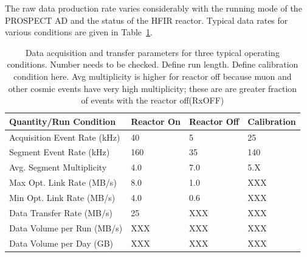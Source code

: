The raw data production rate varies considerably with the running mode of the PROSPECT AD and the status of the HFIR reactor.
Typical data rates for various conditions are given in Table~\ref{tab:dataRates}. 

\begin{table}[tbp]
  \begin{centering}
  \begin{tabular}{l|lll}
  Quantity/Run Condition& Reactor On & Reactor Off & Calibration \\ \hline
  Acquisition Event Rate (kHz) & 40 & 5 &  25 \\
  Segment Event Rate (kHz) & 160 & 35 &  140 \\
  Avg. Segment Multiplicity & 4.0 & 7.0 &  5.X \\
  Max Opt. Link Rate (MB/s) & 8.0 & 1.0 &  XXX \\
  Min Opt. Link Rate (MB/s) & 4.0 & 0.6 &  XXX \\
  Data Transfer Rate (MB/s) & 25 & XXX &  XXX \\
  Data Volume per Run (MB/s) & XXX & XXX &  XXX \\
  Data Volume per Day (GB) & XXX & XXX &  XXX \\
  \end{tabular}
  \caption[dataRates]
  {Data acquisition and transfer parameters for three typical operating conditions. Number needs to be checked. Define run length.
  Define calibration condition here.
  Avg multiplicity is higher for reactor off because muon and other cosmic events have very high multiplicity; these are are greater fraction of events with the reactor off(RxOFF)}
  \label{tab:dataRates}
  \end{centering}
\end{table}


